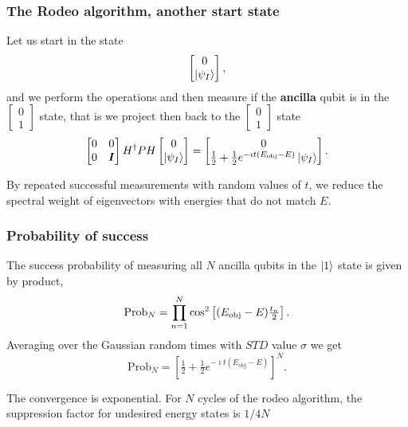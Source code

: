 \documentclass{beamer}
\begin{document}
\begin{frame}
\frametitle{The Rodeo algorithm, another start state}
Let us start in the state
\[
\begin{bmatrix} 0 \\ \ket{\psi_I}\end{bmatrix},
\]
and we perform the operations and then measure if the {\bf ancilla} qubit is in the $\begin{bmatrix} 0 \\ 1\end{bmatrix}$ state, that is  
we project then back to the $\begin{bmatrix} 0 \\ 1\end{bmatrix}$ state 
\[
\begin{bmatrix} 0 & 0 \\ 0 & \bm{I}\end{bmatrix}H^{\dagger}PH\begin{bmatrix} 0 \\ \ket{\psi_I}\end{bmatrix} =\begin{bmatrix} 0\\ \tfrac{1}{2}+\tfrac{1}{2}e^{-\imath t(E_{\mathrm{obj}}-E)}\ket{\psi_I}\end{bmatrix}.
\]

By repeated successful measurements with random values of $t$, we reduce
the spectral weight of eigenvectors with energies that do not match $E$.


\end{frame}



\begin{frame}
\frametitle{Probability of success}


The success probability of measuring all $N$ ancilla qubits in the $\ket{1}$ state is given by product, 
\[
   \mathrm{Prob}_N =\prod_{n=1}^N \cos^2\left[(E_{\rm obj}
   -E)\tfrac{t_n}{2}\right].
\]
Averaging over the Gaussian random times with $STD$ value $\sigma$ we get
\[
   \mathrm{Prob}_N =\left[\tfrac{1}{2}+\tfrac{1}{2}e^{-\imath t(E_{\mathrm{obj}}-E)}\right]^{N}.
\]

The convergence is exponential. For $N$ cycles of the rodeo algorithm, the
suppression factor for undesired energy states is $1/4N$

\end{frame}
\end{document}
